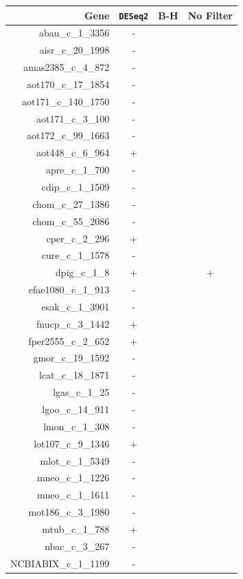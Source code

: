 \documentclass{article}
\begin{document}
\begin{table}[!h]
\begin{center}
\begin{tabular}{r|ccc}
Gene &  \texttt{DESeq2} & B-H & No Filter\\
\hline
abau\_c\_1\_3356 & - &  &   \\
aisr\_c\_20\_1998 & -  &  &   \\
   amas2385\_c\_4\_872 & - &  &   \\
   aot170\_c\_17\_1854 & - &  &   \\
  aot171\_c\_140\_1750 & - &  &   \\
     aot171\_c\_3\_100 & - &  &   \\
   aot172\_c\_99\_1663 & - &  &   \\
   aot448\_c\_6\_964 & +  &  &   \\
  apre\_c\_1\_700 & - &  &   \\
 cdip\_c\_1\_1509 & - &  &   \\
chom\_c\_27\_1386 & - &  &   \\
chom\_c\_55\_2086 & - &  &   \\
  cper\_c\_2\_296   & +  &  &   \\
 cure\_c\_1\_1578 & - &  &   \\
    dpig\_c\_1\_8   & +  &  & +  \\
     efae1080\_c\_1\_913 & - &  &   \\
     esak\_c\_1\_3901 & - &  &   \\
    fnucp\_c\_3\_1442  & + &  &   \\
  fper2555\_c\_2\_652   & +  &  &   \\
   gmor\_c\_19\_1592 & - &  &   \\
 lcat\_c\_18\_1871 & - &  &   \\
    lgas\_c\_1\_25 & - &  &   \\
  lgoo\_c\_14\_911 & - &  &   \\
   lmon\_c\_1\_308 & - &  &   \\
lot107\_c\_9\_1346  &+ &  &   \\ 
  mlot\_c\_1\_5349 & - &  &   \\
  mneo\_c\_1\_1226 & - &  &   \\
  mneo\_c\_1\_1611 & - &  &   \\
  mot186\_c\_3\_1980 & - &  &   \\
      mtub\_c\_1\_788   &+ &  &   \\
      nbac\_c\_3\_267 & - &  &   \\
 NCBIABIX\_c\_1\_1199 & - &  &   \\

\end{tabular}
\end{center}
\end{table}
\end{document}
